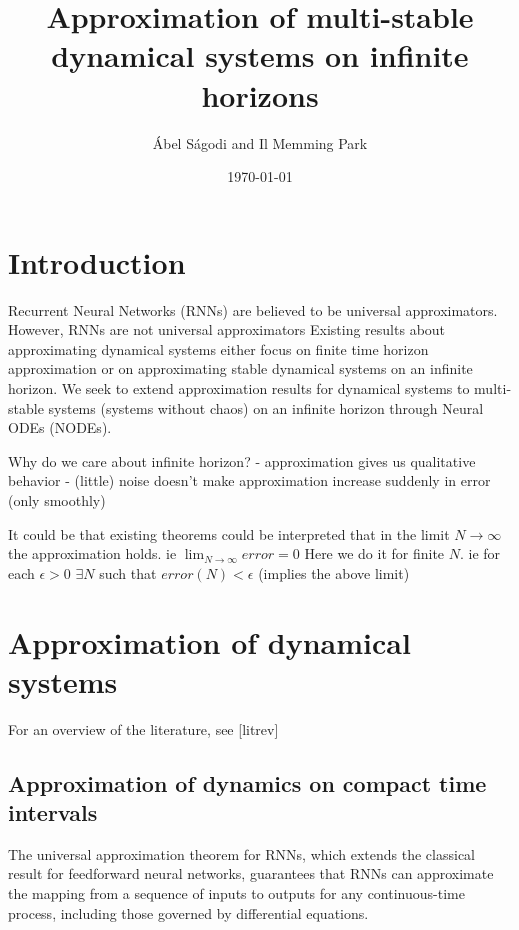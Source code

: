 \documentclass{article}
\title{Approximation of multi-stable dynamical systems on infinite horizons}
\author{\'Abel S\'agodi and Il Memming Park}
\date{\today}
\theoremstyle{definition}
\theoremstyle{remark}
\begin{document}
\maketitle

\section{Introduction}
Recurrent Neural Networks (RNNs) are believed to be universal approximators.
However, RNNs are not universal approximators 
Existing results about approximating dynamical systems either focus on finite time horizon approximation or on approximating stable dynamical systems on an infinite horizon.
We seek to extend approximation results for dynamical systems to multi-stable systems (systems without chaos) on an infinite horizon through Neural ODEs (NODEs).



Why do we care about infinite horizon?
- approximation gives us qualitative behavior
- (little) noise doesn't make approximation increase suddenly in error (only smoothly)


It could be that existing theorems could be interpreted that in the limit $N\rightarrow\infty$ the approximation holds.
ie $\lim_{N\rightarrow\infty} error = 0$
Here we do it for finite $N$.
ie for each $\epsilon>0$ $\exists N$ such that $error(N) < \epsilon$
(implies the above limit)


\section{Approximation of dynamical systems}
For an overview of the literature, see [litrev]


\subsection{Approximation of dynamics on compact time intervals}

The universal approximation theorem for RNNs, which extends the classical result for feedforward neural networks, guarantees that RNNs can approximate the mapping from a sequence of inputs to outputs for any continuous-time process, including those governed by differential equations.
\end{document}
